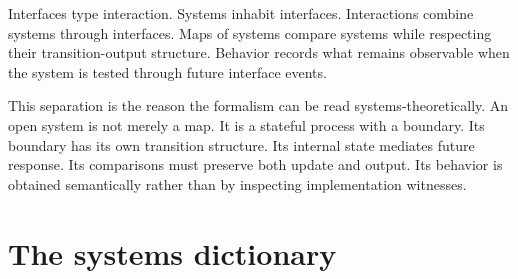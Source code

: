 Interfaces type interaction.  Systems inhabit interfaces.  Interactions
combine systems through interfaces.  Maps of systems compare systems while
respecting their transition-output structure.  Behavior records what remains
observable when the system is tested through future interface events.

This separation is the reason the formalism can be read systems-theoretically.
An open system is not merely a map.  It is a stateful process with a boundary.
Its boundary has its own transition structure.  Its internal state mediates
future response.  Its comparisons must preserve both update and output.  Its
behavior is obtained semantically rather than by inspecting implementation
witnesses.

\section{The systems dictionary}
\label{sec:systems-dictionary}

